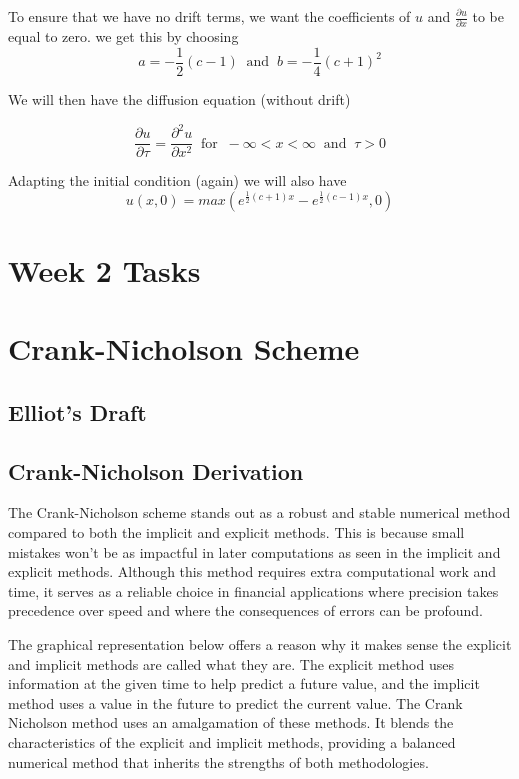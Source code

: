 \documentclass[11pt]{article}
\begin{document}
To ensure that we have no drift terms, we want the coefficients of $u$ and $\frac{\partial u}{\partial x}$ to be equal to zero. we get this by choosing
\[
a = -\frac{1}{2}(c-1)  \;\; \text{and}  \;\; b = -\frac{1} {4}(c+1)^2
\]

We will then have the diffusion equation (without drift)

\[
\frac{\partial u}{\partial \tau} = \frac{\partial^2 u}{\partial x^2} \;\; \text{for} \;\; -\infty < x < \infty \;\; \text{and} \;\; \tau >0
\]

Adapting the initial condition (again) we will also have 
\[
u(x,0) = max(e^{\frac{1}{2}(c+1)x}- e^{\frac{1}{2}(c-1)x} , 0 )
\]

\newpage
\section{Week 2 Tasks} %

\section{Crank-Nicholson Scheme} 

\subsection{Elliot's Draft}


\subsection{Crank-Nicholson Derivation}

The Crank-Nicholson scheme stands out as a robust and stable numerical method compared to both the implicit and explicit methods. This is because small mistakes won't be as impactful in later computations as seen in the implicit and explicit methods. Although this method requires extra computational work and time, it serves as a reliable choice in financial applications where precision takes precedence over speed and where the consequences of errors can be profound.

The graphical representation below offers a reason why it makes sense the explicit and implicit methods are called what they are. The explicit method uses information at the given time to help predict a future value, and the implicit method uses a value in the future to predict the current value. The Crank Nicholson method uses an amalgamation of these methods. It blends the characteristics of the explicit and implicit methods, providing a balanced numerical method that inherits the strengths of both methodologies.
\end{document}
